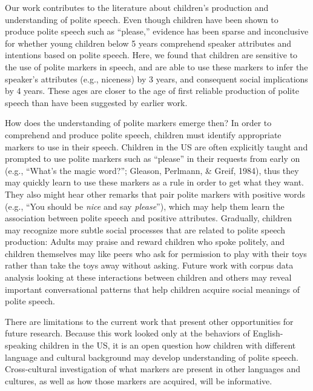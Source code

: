 \documentclass[10pt, letterpaper]{article}
\begin{document}
Our work contributes to the literature about children's production and
understanding of polite speech. Even though children have been shown to
produce polite speech such as ``please,'' evidence has been sparse and
inconclusive for whether young children below 5 years comprehend speaker
attributes and intentions based on polite speech. Here, we found that
children are sensitive to the use of polite markers in speech, and are
able to use these markers to infer the speaker's attributes (e.g.,
niceness) by 3 years, and consequent social implications by 4 years.
These ages are closer to the age of first reliable production of polite
speech than have been suggested by earlier work.

How does the understanding of polite markers emerge then? In order to
comprehend and produce polite speech, children must identify appropriate
markers to use in their speech. Children in the US are often explicitly
taught and prompted to use polite markers such as ``please'' in their
requests from early on (e.g., ``What's the magic word?''; Gleason,
Perlmann, \& Greif, 1984), thus they may quickly learn to use these
markers as a rule in order to get what they want. They also might hear
other remarks that pair polite markers with positive words (e.g., ``You
should be \emph{nice} and say \emph{please}''), which may help them
learn the association between polite speech and positive attributes.
Gradually, children may recognize more subtle social processes that are
related to polite speech production: Adults may praise and reward
children who spoke politely, and children themselves may like peers who
ask for permission to play with their toys rather than take the toys
away without asking. Future work with corpus data analysis looking at
these interactions between children and others may reveal important
conversational patterns that help children acquire social meanings of
polite speech.

There are limitations to the current work that present other
opportunities for future research. Because this work looked only at the
behaviors of English-speaking children in the US, it is an open question
how children with different language and cultural background may develop
understanding of polite speech. Cross-cultural investigation of what
markers are present in other languages and cultures, as well as how
those markers are acquired, will be informative.
\end{document}
